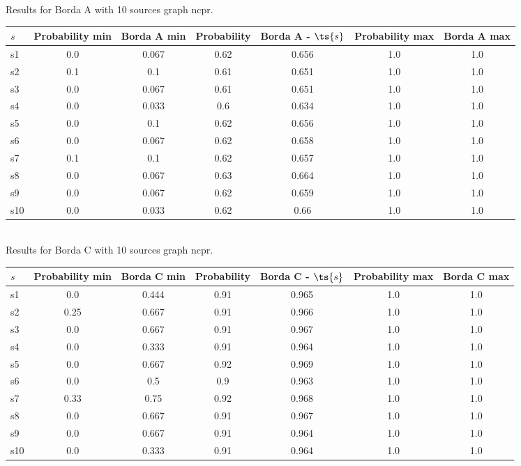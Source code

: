 \documentclass{article}
\begin{document}
\noindent Results for Borda A with 10 sources graph ncpr.

\noindent\begin{tabular}{|l|c|c|c|c|c|c|}
\hline
$s$& Probability min & Borda A min & Probability & Borda A - $\ts{s}$ & Probability max & Borda A max\\
\hline
s1 &0.0 & 0.067 & 0.62 & 0.656 & 1.0 & 1.0\\
\hline
s2 &0.1 & 0.1 & 0.61 & 0.651 & 1.0 & 1.0\\
\hline
s3 &0.0 & 0.067 & 0.61 & 0.651 & 1.0 & 1.0\\
\hline
s4 &0.0 & 0.033 & 0.6 & 0.634 & 1.0 & 1.0\\
\hline
s5 &0.0 & 0.1 & 0.62 & 0.656 & 1.0 & 1.0\\
\hline
s6 &0.0 & 0.067 & 0.62 & 0.658 & 1.0 & 1.0\\
\hline
s7 &0.1 & 0.1 & 0.62 & 0.657 & 1.0 & 1.0\\
\hline
s8 &0.0 & 0.067 & 0.63 & 0.664 & 1.0 & 1.0\\
\hline
s9 &0.0 & 0.067 & 0.62 & 0.659 & 1.0 & 1.0\\
\hline
s10 &0.0 & 0.033 & 0.62 & 0.66 & 1.0 & 1.0\\
\hline
\end{tabular}\\

\noindent Results for Borda C with 10 sources graph ncpr.

\noindent\begin{tabular}{|l|c|c|c|c|c|c|}
\hline
$s$& Probability min & Borda C min & Probability & Borda C - $\ts{s}$ & Probability max & Borda C max\\
\hline
s1 &0.0 & 0.444 & 0.91 & 0.965 & 1.0 & 1.0\\
\hline
s2 &0.25 & 0.667 & 0.91 & 0.966 & 1.0 & 1.0\\
\hline
s3 &0.0 & 0.667 & 0.91 & 0.967 & 1.0 & 1.0\\
\hline
s4 &0.0 & 0.333 & 0.91 & 0.964 & 1.0 & 1.0\\
\hline
s5 &0.0 & 0.667 & 0.92 & 0.969 & 1.0 & 1.0\\
\hline
s6 &0.0 & 0.5 & 0.9 & 0.963 & 1.0 & 1.0\\
\hline
s7 &0.33 & 0.75 & 0.92 & 0.968 & 1.0 & 1.0\\
\hline
s8 &0.0 & 0.667 & 0.91 & 0.967 & 1.0 & 1.0\\
\hline
s9 &0.0 & 0.667 & 0.91 & 0.964 & 1.0 & 1.0\\
\hline
s10 &0.0 & 0.333 & 0.91 & 0.964 & 1.0 & 1.0\\
\hline
\end{tabular}\\
\end{document}
